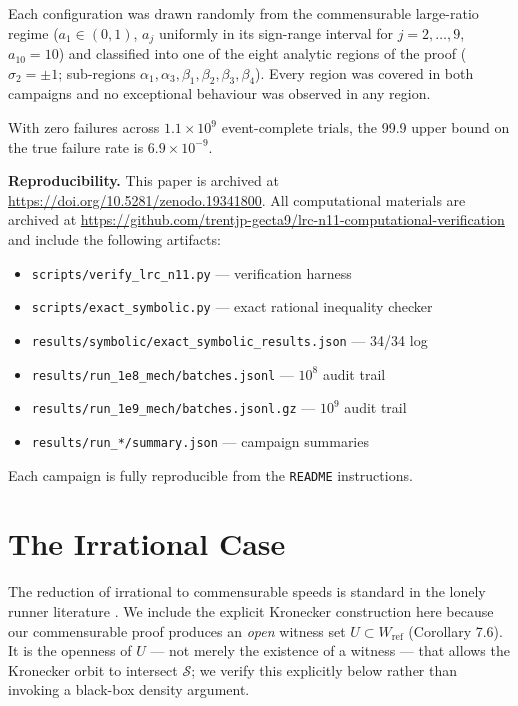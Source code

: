 \documentclass[12pt]{article}
\begin{document}
Each configuration was drawn randomly from the commensurable large-ratio regime
($a_1\in(0,1)$, $a_j$ uniformly in its sign-range interval for $j=2,\ldots,9$,
$a_{10}=10$) and classified into one of the eight analytic regions of the proof
($\sigma_2=\pm1$; sub-regions $\alpha_1,\alpha_3,\beta_1,\beta_2,\beta_3,\beta_4$).
Every region was covered in both campaigns and no exceptional behaviour was observed
in any region.

With zero failures across $1.1\times10^9$ event-complete trials, the 99.9%
upper bound on the true failure rate is $6.9\times10^{-9}$.

\textbf{Reproducibility.}
This paper is archived at \url{https://doi.org/10.5281/zenodo.19341800}.
All computational materials are archived at
\url{https://github.com/trentjp-gecta9/lrc-n11-computational-verification}
and include the following artifacts:

\begin{itemize}
\item \texttt{scripts/verify\_lrc\_n11.py} — verification harness
\item \texttt{scripts/exact\_symbolic.py} — exact rational inequality checker
\item \texttt{results/symbolic/exact\_symbolic\_results.json} — 34/34 log
\item \texttt{results/run\_1e8\_mech/batches.jsonl} — $10^8$ audit trail
\item \texttt{results/run\_1e9\_mech/batches.jsonl.gz} — $10^9$ audit trail
\item \texttt{results/run\_*/summary.json} — campaign summaries
\end{itemize}

Each campaign is fully reproducible from the \texttt{README} instructions.



\section{The Irrational Case}

The reduction of irrational to commensurable speeds is standard in the lonely runner
literature \cite{KN74}. We include the explicit Kronecker construction here because our
commensurable proof produces an \emph{open} witness set $U\subset W_{\mathrm{ref}}$ (Corollary 7.6).
It is the openness of $U$ — not merely the existence of a witness — that allows the
Kronecker orbit to intersect $\mathcal{S}$; we verify this explicitly below rather than
invoking a black-box density argument.
\end{document}
